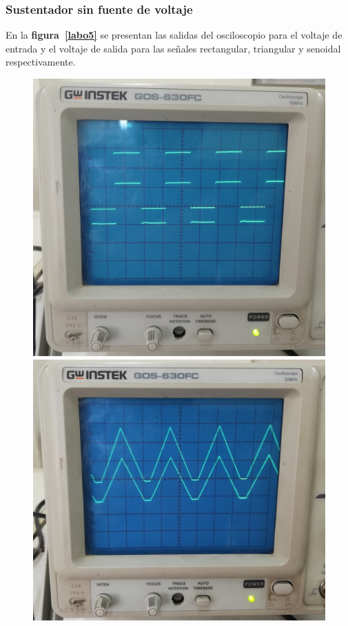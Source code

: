 \documentclass[letter,twoside,11pt]{article}
\begin{document}
\subsubsection{Sustentador sin fuente de voltaje}
En la \textbf{figura~\ref{labo5}} se presentan las salidas del osciloscopio para
el voltaje de entrada y el voltaje de salida para las señales rectangular,
triangular y senoidal respectivamente.

\begin{figure}[!h]
\centering
\includegraphics[scale=0.055]{fotos/labo1.9.eps}
\includegraphics[scale=0.065]{fotos/labo1.10.eps}

\end{figure}
\end{document}
